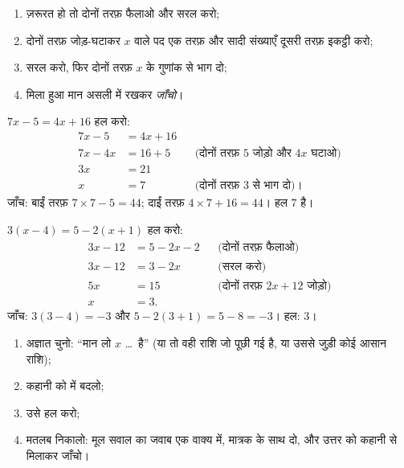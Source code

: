 \begin{method}\label{met:g8:equations:solve}
\begin{enumerate}
  \item ज़रूरत हो तो दोनों तरफ़ फैलाओ और सरल करो;
  \item दोनों तरफ़ जोड़-घटाकर $x$ वाले पद एक तरफ़ और सादी संख्याएँ
        दूसरी तरफ़ इकट्ठी करो;
  \item सरल करो, फिर दोनों तरफ़ $x$ के गुणांक से भाग दो;
  \item मिला हुआ मान असली  में रखकर \emph{जाँचो}।
\end{enumerate}
\end{method}

\begin{example}\label{ex:g8:equations:solve}
$7x - 5 = 4x + 16$ हल करो:
\begin{align*}
7x - 5 &= 4x + 16 \\
7x - 4x &= 16 + 5
&& \text{(दोनों तरफ़ $5$ जोड़ो और $4x$ घटाओ)} \\
3x &= 21 \\
x &= 7 && \text{(दोनों तरफ़ $3$ से भाग दो)।}
\end{align*}
जाँच: बाईं तरफ़ $7 \times 7 - 5 = 44$; दाईं तरफ़
$4 \times 7 + 16 = 44$। हल $7$ है।
\end{example}

\begin{example}[कोष्ठक और ऋण संख्याओं के साथ]\label{ex:g8:equations:brackets}
$3(x - 4) = 5 - 2(x + 1)$ हल करो:
\begin{align*}
3x - 12 &= 5 - 2x - 2 && \text{(दोनों तरफ़ फैलाओ)} \\
3x - 12 &= 3 - 2x && \text{(सरल करो)} \\
5x &= 15 && \text{(दोनों तरफ़ $2x + 12$ जोड़ो)} \\
x &= 3 .
\end{align*}
जाँच: $3(3 - 4) = -3$ और $5 - 2(3+1) = 5 - 8 = -3$। \quad हल:
$3$।
\end{example}

\begin{method}\label{met:g8:equations:problem}
\begin{enumerate}
  \item अज्ञात चुनो: ``मान लो $x$ \dots\ है'' (या तो वही राशि जो
        पूछी गई है, या उससे जुड़ी कोई आसान राशि);
  \item कहानी को  में बदलो;
  \item उसे हल करो;
  \item मतलब निकालो: मूल सवाल का जवाब एक वाक्य में, मात्रक के साथ
        दो, और उत्तर को कहानी से मिलाकर जाँचो।
\end{enumerate}
\end{method}

